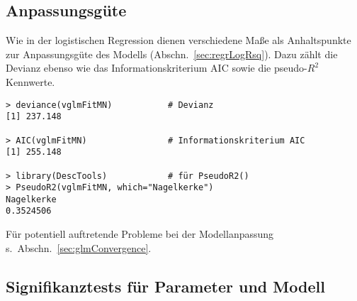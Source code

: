 \subsection{Anpassungsgüte}

Wie in der logistischen Regression dienen verschiedene Maße als Anhaltspunkte zur Anpassungsgüte des Modells (Abschn.\ \ref{sec:regrLogRsq}). Dazu zählt die Devianz ebenso wie das Informationskriterium AIC sowie die pseudo-$R^{2}$ Kennwerte.
\begin{lstlisting}
> deviance(vglmFitMN)           # Devianz
[1] 237.148

> AIC(vglmFitMN)                # Informationskriterium AIC
[1] 255.148

> library(DescTools)            # für PseudoR2()
> PseudoR2(vglmFitMN, which="Nagelkerke")
Nagelkerke 
0.3524506 
\end{lstlisting}

Für potentiell auftretende Probleme bei der Modellanpassung s.\ Abschn.\ \ref{sec:glmConvergence}.

\subsection{Signifikanztests für Parameter und Modell}

